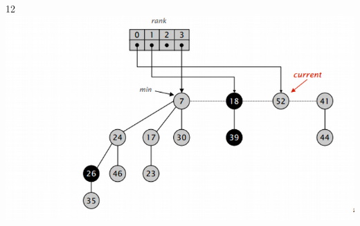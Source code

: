 \documentclass{beamer}
\begin{document}
\begin{frame}
\begin{columns}[t]
    12
    \includegraphics[width =1 \textwidth]{imagenes/delete12.png}

   \end{columns}
   

\end{frame}
\end{document}
